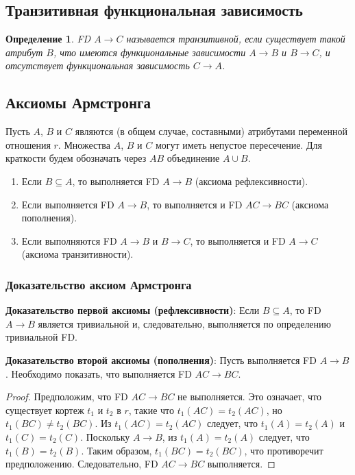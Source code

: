 \documentclass[a4paper,12pt]{article}
\newtheorem{definition}{Определение}
\begin{document}
\subsection{Транзитивная функциональная зависимость}

\begin{definition}
    FD $A \rightarrow C$ называется транзитивной, если существует такой атрибут $B$, что имеются функциональные зависимости $A \rightarrow B$ и $B \rightarrow C$, и отсутствует функциональная зависимость $C \rightarrow A$.
\end{definition}

\subsection{Аксиомы Армстронга}

Пусть $A$, $B$ и $C$ являются (в общем случае, составными) атрибутами переменной отношения $r$. Множества $A$, $B$ и $C$ могут иметь непустое пересечение. Для краткости будем обозначать через $AB$ объединение $A \cup B$.

\begin{enumerate}
    \item Если $B \subseteq A$, то выполняется FD $A \rightarrow B$ (аксиома рефлексивности).
    \item Если выполняется FD $A \rightarrow B$, то выполняется и FD $AC \rightarrow BC$ (аксиома пополнения).
    \item Если выполняются FD $A \rightarrow B$ и $B \rightarrow C$, то выполняется и FD $A \rightarrow C$ (аксиома транзитивности).
\end{enumerate}

\subsubsection{Доказательство аксиом Армстронга}

\textbf{Доказательство первой аксиомы (рефлексивности)}: Если $B \subseteq A$, то FD $A \rightarrow B$ является тривиальной и, следовательно, выполняется по определению тривиальной FD.

\textbf{Доказательство второй аксиомы (пополнения)}: Пусть выполняется FD $A \rightarrow B$. Необходимо показать, что выполняется FD $AC \rightarrow BC$.
\begin{proof}
    Предположим, что FD $AC \rightarrow BC$ не выполняется. Это означает, что существует кортеж $t_1$ и $t_2$ в $r$, такие что $t_1(AC) = t_2(AC)$, но $t_1(BC) \neq t_2(BC)$. Из $t_1(AC) = t_2(AC)$ следует, что $t_1(A) = t_2(A)$ и $t_1(C) = t_2(C)$. Поскольку $A \rightarrow B$, из $t_1(A) = t_2(A)$ следует, что $t_1(B) = t_2(B)$. Таким образом, $t_1(BC) = t_2(BC)$, что противоречит предположению. Следовательно, FD $AC \rightarrow BC$ выполняется.
\end{proof}
\end{document}
